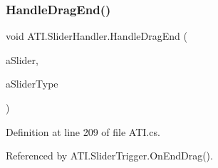 \subsubsection{\texorpdfstring{Handle\+Drag\+End()}{HandleDragEnd()}}
{\footnotesize\ttfamily void A\+T\+I.\+Slider\+Handler.\+Handle\+Drag\+End (\begin{DoxyParamCaption}\item[{Slider}]{a\+Slider,  }\item[{\hyperlink{class_a_t_i_ac4c6056a99cbd16ff0d292d33b038b9b}{Slider\+Type}}]{a\+Slider\+Type }\end{DoxyParamCaption})}



Definition at line 209 of file A\+T\+I.\+cs.



Referenced by A\+T\+I.\+Slider\+Trigger.\+On\+End\+Drag().


